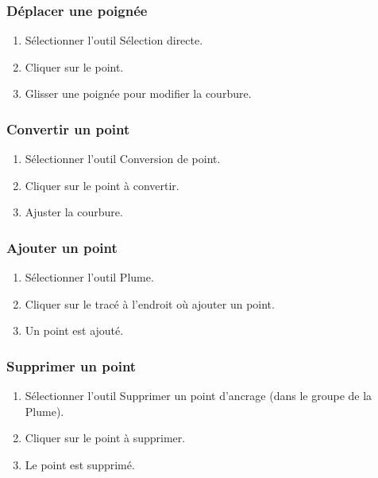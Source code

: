 \subsubsection{Déplacer une poignée}

\begin{enumerate}
    \item Sélectionner l'outil Sélection directe.
    \item Cliquer sur le point.
    \item Glisser une poignée pour modifier la courbure.
\end{enumerate}

\subsubsection{Convertir un point}

\begin{enumerate}
    \item Sélectionner l'outil Conversion de point.
    \item Cliquer sur le point à convertir.
    \item Ajuster la courbure.
\end{enumerate}

\subsubsection{Ajouter un point}

\begin{enumerate}
    \item Sélectionner l'outil Plume.
    \item Cliquer sur le tracé à l'endroit où ajouter un point.
    \item Un point est ajouté.
\end{enumerate}

\subsubsection{Supprimer un point}

\begin{enumerate}
    \item Sélectionner l'outil Supprimer un point d'ancrage (dans le groupe de la Plume).
    \item Cliquer sur le point à supprimer.
    \item Le point est supprimé.
\end{enumerate}

